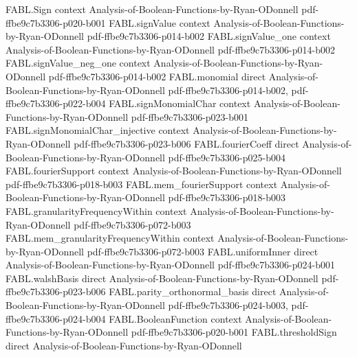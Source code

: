 \begin{theorem}
\label{FABL.noiseOperator_monomial}
\leanok
{}
\proofstep
  {FABL.Sign}
  {context}
  {Analysis-of-Boolean-Functions-by-Ryan-ODonnell}
  {pdf-ffbe9c7b3306-p020-b001}
\proofstep
  {FABL.signValue}
  {context}
  {Analysis-of-Boolean-Functions-by-Ryan-ODonnell}
  {pdf-ffbe9c7b3306-p014-b002}
\proofstep
  {FABL.signValue_one}
  {context}
  {Analysis-of-Boolean-Functions-by-Ryan-ODonnell}
  {pdf-ffbe9c7b3306-p014-b002}
\proofstep
  {FABL.signValue_neg_one}
  {context}
  {Analysis-of-Boolean-Functions-by-Ryan-ODonnell}
  {pdf-ffbe9c7b3306-p014-b002}
\proofstep
  {FABL.monomial}
  {direct}
  {Analysis-of-Boolean-Functions-by-Ryan-ODonnell}
  {pdf-ffbe9c7b3306-p014-b002,
    pdf-ffbe9c7b3306-p022-b004}
\proofstep
  {FABL.signMonomialChar}
  {context}
  {Analysis-of-Boolean-Functions-by-Ryan-ODonnell}
  {pdf-ffbe9c7b3306-p023-b001}
\proofstep
  {FABL.signMonomialChar_injective}
  {context}
  {Analysis-of-Boolean-Functions-by-Ryan-ODonnell}
  {pdf-ffbe9c7b3306-p023-b006}
\proofstep
  {FABL.fourierCoeff}
  {direct}
  {Analysis-of-Boolean-Functions-by-Ryan-ODonnell}
  {pdf-ffbe9c7b3306-p025-b004}
\proofstep
  {FABL.fourierSupport}
  {context}
  {Analysis-of-Boolean-Functions-by-Ryan-ODonnell}
  {pdf-ffbe9c7b3306-p018-b003}
\proofstep
  {FABL.mem_fourierSupport}
  {context}
  {Analysis-of-Boolean-Functions-by-Ryan-ODonnell}
  {pdf-ffbe9c7b3306-p018-b003}
\proofstep
  {FABL.granularityFrequencyWithin}
  {context}
  {Analysis-of-Boolean-Functions-by-Ryan-ODonnell}
  {pdf-ffbe9c7b3306-p072-b003}
\proofstep
  {FABL.mem_granularityFrequencyWithin}
  {context}
  {Analysis-of-Boolean-Functions-by-Ryan-ODonnell}
  {pdf-ffbe9c7b3306-p072-b003}
\proofstep
  {FABL.uniformInner}
  {direct}
  {Analysis-of-Boolean-Functions-by-Ryan-ODonnell}
  {pdf-ffbe9c7b3306-p024-b001}
\proofstep
  {FABL.walshBasis}
  {direct}
  {Analysis-of-Boolean-Functions-by-Ryan-ODonnell}
  {pdf-ffbe9c7b3306-p023-b006}
\proofstep
  {FABL.parity_orthonormal_basis}
  {direct}
  {Analysis-of-Boolean-Functions-by-Ryan-ODonnell}
  {pdf-ffbe9c7b3306-p024-b003,
    pdf-ffbe9c7b3306-p024-b004}
\proofstep
  {FABL.BooleanFunction}
  {context}
  {Analysis-of-Boolean-Functions-by-Ryan-ODonnell}
  {pdf-ffbe9c7b3306-p020-b001}
\proofstep
  {FABL.thresholdSign}
  {direct}
  {Analysis-of-Boolean-Functions-by-Ryan-ODonnell}

\end{theorem}
